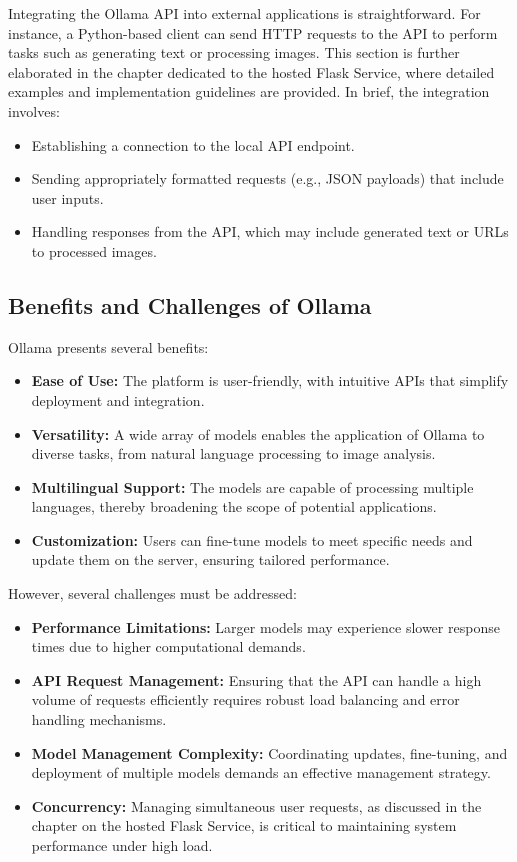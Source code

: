 Integrating the Ollama API into external applications is straightforward. For instance, a Python-based client can send HTTP requests to the API to perform tasks such as generating text or processing images. This section is further elaborated in the chapter dedicated to the hosted Flask Service, where detailed examples and implementation guidelines are provided. In brief, the integration involves:
\begin{itemize}
  \item Establishing a connection to the local API endpoint.
  \item Sending appropriately formatted requests (e.g., JSON payloads) that include user inputs.
  \item Handling responses from the API, which may include generated text or URLs to processed images.
\end{itemize}

\subsection{Benefits and Challenges of Ollama}

Ollama presents several benefits:
\begin{itemize}
  \item \textbf{Ease of Use:} The platform is user-friendly, with intuitive APIs that simplify deployment and integration.
  \item \textbf{Versatility:} A wide array of models enables the application of Ollama to diverse tasks, from natural language processing to image analysis.
  \item \textbf{Multilingual Support:} The models are capable of processing multiple languages, thereby broadening the scope of potential applications.
  \item \textbf{Customization:} Users can fine-tune models to meet specific needs and update them on the server, ensuring tailored performance.
\end{itemize}

However, several challenges must be addressed:
\begin{itemize}
  \item \textbf{Performance Limitations:} Larger models may experience slower response times due to higher computational demands.
  \item \textbf{API Request Management:} Ensuring that the API can handle a high volume of requests efficiently requires robust load balancing and error handling mechanisms.
  \item \textbf{Model Management Complexity:} Coordinating updates, fine-tuning, and deployment of multiple models demands an effective management strategy.
  \item \textbf{Concurrency:} Managing simultaneous user requests, as discussed in the chapter on the hosted Flask Service, is critical to maintaining system performance under high load.
\end{itemize}

